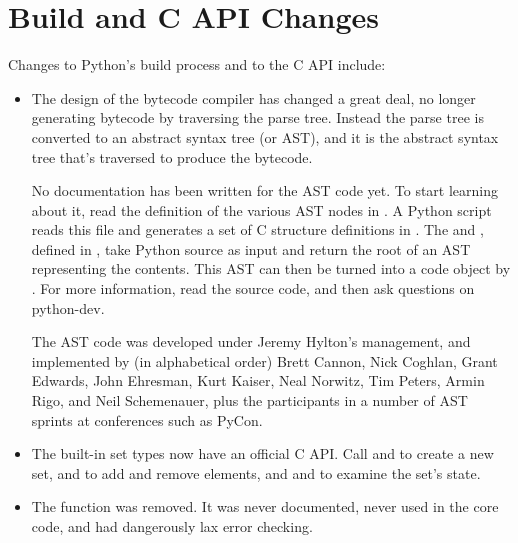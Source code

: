 \documentclass{howto}
\begin{document}





\section{Build and C API Changes}

Changes to Python's build process and to the C API include:

\begin{itemize}

\item The design of the bytecode compiler has changed a great deal, no
longer generating bytecode by traversing the parse tree.  Instead
the parse tree is converted to an abstract syntax tree (or AST), and it is 
the abstract syntax tree that's traversed to produce the bytecode.

No documentation has been written for the AST code yet.  To start
learning about it, read the definition of the various AST nodes in
.  A Python script reads this file and
generates a set of C structure definitions in
.  The 
and , defined in
, take Python source as input and return the
root of an AST representing the contents.  This AST can then be turned
into a code object by .  For more
information, read the source code, and then ask questions on
python-dev.

The AST code was developed under Jeremy Hylton's management, and
implemented by (in alphabetical order) Brett Cannon, Nick Coghlan,
Grant Edwards, John Ehresman, Kurt Kaiser, Neal Norwitz, Tim Peters,
Armin Rigo, and Neil Schemenauer, plus the participants in a number of
AST sprints at conferences such as PyCon.
 
\item The built-in set types now have an official C API.  Call
 and  to create a
new set,  and  to
add and remove elements, and  and
 to examine the set's state.

\item The  function was removed.  It was
never documented, never used in the core code, and had dangerously lax
error checking.

\end{itemize}
\end{document}
